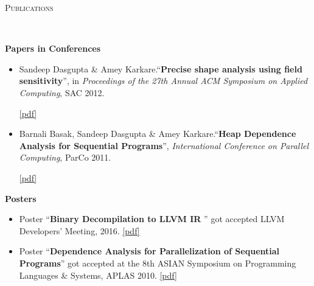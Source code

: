 \documentclass[9pt]{article}
\newenvironment{changemargin}[2]{%
  \begin{list}{}{%
    \setlength{\topsep}{0pt}%
    \setlength{\leftmargin}{#1}%
    \setlength{\rightmargin}{#2}%
    \setlength{\listparindent}{\parindent}%
    \setlength{\itemindent}{\parindent}%
    \setlength{\parsep}{\parskip}%
  }%
  \item[]}{\end{list}
}
\newcommand{\lineover}{
	\begin{changemargin}{-0.05in}{-0.05in}
		\vspace*{-8pt}
		\hrulefill \\
		\vspace*{-2pt}
	\end{changemargin}
}
\newcommand{\header}[1]{
	\begin{changemargin}{-0.5in}{-0.5in}
		\scshape{#1}\\
  	\lineover
	\end{changemargin}
}
\newcommand{\cmnt}[1]{}
\newenvironment{body} {
	\vspace*{-16pt}
	\begin{changemargin}{-0.25in}{-0.5in}
  }	
	{\end{changemargin}
}
\begin{document}
\header{Publications}
\begin{body}
\vspace{14pt}
\textbf{Papers in Conferences}\\
	\vspace*{-4pt}
	\begin{itemize} \itemsep -0pt
		\item Sandeep Dasgupta \& Amey Karkare.``\textbf{Precise shape analysis using field sensitivity}'', in \emph{Proceedings of the 27th Annual ACM Symposium on Applied Computing}, SAC 2012. 
                \cmnt{ \href{http://dx.doi.org/10.1145/2245276.2231982}{doi: 10.1145/2231936.2231982}. }
                \href{http://webhost.engr.illinois.edu/~sdasgup3/Document/sac_2012.pdf}{[pdf]}\\

		\item Barnali Basak, Sandeep Dasgupta \& Amey Karkare.``\textbf{Heap Dependence Analysis for Sequential Programs}'', \emph{International Conference on Parallel Computing}, ParCo 2011. 
                \cmnt{ \href{http://dx.doi.org/10.3233/978-1-61499-041-3-99}{doi: 10.3233/978-1-61499-041-3-99}.  }
                \href{http://webhost.engr.illinois.edu/~sdasgup3/Document/parco_2011.pdf}{[pdf]} \\
                  \cmnt{
		\begin{itemize} \itemsep -0pt
			\item Published in: Applications, Tools and Techniques on the Road to Exascale Computing, 22 volume of Advances in 
				Parallel Computing, chapter: Heap Dependence Analysis for Sequential Programs, pages 99--106. IOS Press, May 2012. 
				doi: \href{http://dx.doi.org/10.3233/978-1-61499-041-3-99}{10.3233/978-1-61499-041-3-99}, isbn: 978-1-61499-040-6.
		\end{itemize}
                  }
	\end{itemize}

\textbf{Posters}\\
	\vspace*{-4pt}
	\begin{itemize} \itemsep -0pt
                \item Poster ``\textbf{Binary Decompilation to LLVM IR
                  }'' got accepted LLVM Developers' Meeting, 2016.
                  \href{https://www.dropbox.com/s/8s20r8pi3eu4knw/allin_poster.pdf?dl=0}{[pdf]}

                \item Poster ``\textbf{Dependence Analysis for Parallelization
                  of Sequential Programs}'' got accepted at the 8th ASIAN
                  Symposium on Programming Languages \& Systems, APLAS 2010.
                  \href{http://webhost.engr.illinois.edu/~sdasgup3/Document/poster_APLAS2010.pdf}{[pdf]}
	\end{itemize}


\end{body}
\end{document}

